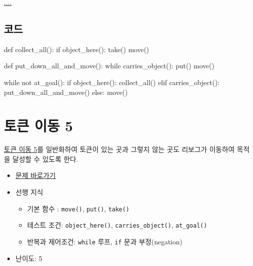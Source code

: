 \documentclass[
  b5paperpaper,
  DIV=11,
  numbers=noendperiod]{scrreprt}
\newenvironment{Shaded}{\begin{snugshade}}{\end{snugshade}}
\newcommand{\ControlFlowTok}[1]{\textcolor[rgb]{0.00,0.23,0.31}{#1}}
\newcommand{\KeywordTok}[1]{\textcolor[rgb]{0.00,0.23,0.31}{#1}}
\newcommand{\NormalTok}[1]{\textcolor[rgb]{0.00,0.23,0.31}{#1}}
\providecommand{\tightlist}{%
  \setlength{\itemsep}{0pt}\setlength{\parskip}{0pt}}\usepackage{longtable,booktabs,array}
\begin{document}
\url{....}

\hypertarget{uxcf54uxb4dc-18}{%
\subsection{코드}\label{uxcf54uxb4dc-18}}

\begin{Shaded}
\begin{Highlighting}[]
\KeywordTok{def}\NormalTok{ collect\_all():}
    \ControlFlowTok{if}\NormalTok{ object\_here():}
\NormalTok{        take()}
\NormalTok{    move()}

\KeywordTok{def}\NormalTok{ put\_down\_all\_and\_move():}
    \ControlFlowTok{while}\NormalTok{ carries\_object():}
\NormalTok{        put()}
\NormalTok{    move()}
    
\ControlFlowTok{while} \KeywordTok{not}\NormalTok{ at\_goal():}
    \ControlFlowTok{if}\NormalTok{ object\_here():}
\NormalTok{        collect\_all()}
    \ControlFlowTok{elif}\NormalTok{ carries\_object():}
\NormalTok{        put\_down\_all\_and\_move()  }
    \ControlFlowTok{else}\NormalTok{:}
\NormalTok{        move()}
\end{Highlighting}
\end{Shaded}

\hypertarget{token-05}{%
\section{토큰 이동 5}\label{token-05}}

\protect\hyperlink{token-04}{토큰 이동 5}를 일반화하여 토큰이 있는 곳과
그렇지 않는 곳도 리보그가 이동하여 목적을 달성할 수 있도록 한다.

\begin{itemize}
\tightlist
\item
  \href{https://reeborg.ca/reeborg.html?lang=ko-en\&mode=python\&menu=worlds\%2Fmenus\%2Freeborg_intro_en.json\&name=Tokens\%205\&url=worlds\%2Ftutorial_en\%2Ftokens5.json}{문제
  바로가기}
\item
  선행 지식

  \begin{itemize}
  \tightlist
  \item
    기본 함수 : \texttt{move()}, \texttt{put()}, \texttt{take()}
  \item
    테스트 조건: \texttt{object\_here()}, \texttt{carries\_object()},
    \texttt{at\_goal()}
  \item
    반복과 제어조건: \texttt{while} 루프, \texttt{if} 문과
    부정(negation)
  \end{itemize}
\item
  난이도: 5
\end{itemize}
\end{document}
